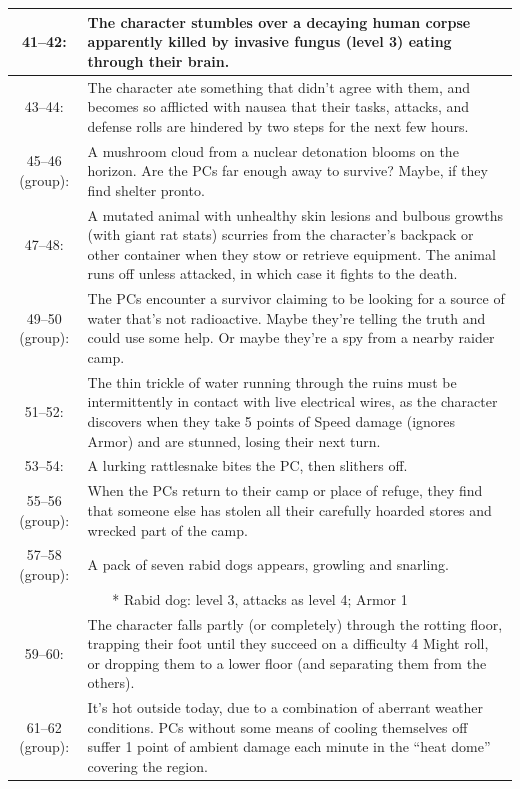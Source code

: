 \begin{longtable}{| c | p{12cm} |}
41–42:  & The character stumbles over a decaying human corpse apparently killed by invasive fungus (level 3) eating through their brain. \\ \hline
43–44:  & The character ate something that didn’t agree with them, and becomes so afflicted with nausea that their tasks, attacks, and defense rolls are hindered by two steps for the next few hours. \\ \hline
45–46 (group): &  A mushroom cloud from a nuclear detonation blooms on the horizon. Are the PCs far enough away to survive? Maybe, if they find shelter pronto. \\ \hline
47–48:  & A mutated animal with unhealthy skin lesions and bulbous growths (with giant rat stats) scurries from the character’s backpack or other container when they stow or retrieve equipment. The animal runs off unless attacked, in which case it fights to the death. \\ \hline
49–50 (group): &  The PCs encounter a survivor claiming to be looking for a source of water that’s not radioactive. Maybe they’re telling the truth and could use some help. Or maybe they’re a spy from a nearby raider camp. \\ \hline
51–52: &  The thin trickle of water running through the ruins must be intermittently in contact with live electrical wires, as the character discovers when they take 5 points of Speed damage (ignores Armor) and are stunned, losing their next turn. \\ \hline
53–54: &  A lurking rattlesnake bites the PC, then slithers off. \\ \hline
55–56 (group): &  When the PCs return to their camp or place of refuge, they find that someone else has stolen all their carefully hoarded stores and wrecked part of the camp. \\ \hline
57–58 (group): &  A pack of seven rabid dogs appears, growling and snarling. \\ \hline
 \multicolumn{2}{|p{15cm}|}{* Rabid dog: level 3, attacks as level 4; Armor 1} \\ \hline
59–60: &  The character falls partly (or completely) through the rotting floor, trapping their foot until they succeed on a difficulty 4 Might roll, or dropping them to a lower floor (and separating them from the others). \\ \hline
61–62 (group): &  It’s hot outside today, due to a combination of aberrant weather conditions. PCs without some means of cooling themselves off suffer 1 point of ambient damage each minute in the “heat dome” covering the region. \\ \hline

\end{longtable}
